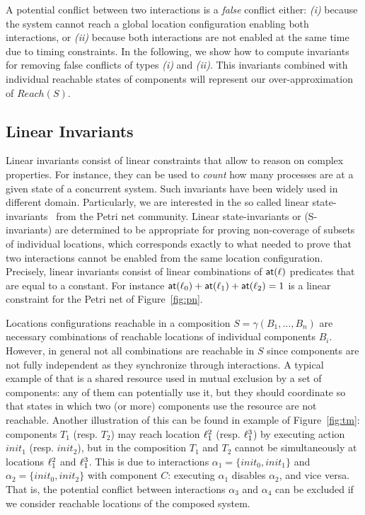 A potential conflict between two interactions is a \emph{false} conflict either: \emph{(i)} 
because the system cannot reach a global location configuration enabling both interactions, 
or \emph{(ii)} because both interactions are not enabled at the same time due to timing 
constraints.
In the following, we show how to compute invariants for removing false conflicts of
types \emph{(i)} and \emph{(ii)}. This invariants combined with
individual reachable states of components will represent our over-approximation of $Reach(S)$.
\subsection{Linear Invariants}

Linear invariants consist of linear constraints that allow to reason on complex properties.
For instance, they can be used to \emph{count} how many processes are at a given state
of a concurrent system. Such invariants have been widely used in different domain.
Particularly, we are interested in the so called linear state-invariants~\cite{petri,inv1,inv2} 
from the 
Petri net community. Linear state-invariants or (S-invariants) are determined to be 
appropriate for proving non-coverage of subsets of individual locations, 
which corresponds exactly to what needed to prove that two interactions 
cannot be enabled from the same location configuration.
Precisely, linear invariants consist of linear combinations of $\textsf{at}(\ell)$ predicates that are
equal to a constant. For instance $\textsf{at}(\ell_0)+\textsf{at}(\ell_1)+\textsf{at}(\ell_2)=1$ is a linear constraint
for the Petri net of Figure~\ref{fig:pn}.

Locations configurations reachable in a composition 
$S = \gamma(B_1,\dotsc,B_n)$ are necessary combinations 
of reachable locations of individual components $B_i$.
However, in general not all combinations are reachable in $S$ since components are not 
fully independent as they synchronize through interactions.
A typical example of that is a shared resource used in mutual exclusion by a set of 
components: any of them can potentially use it, but they should coordinate so that states in 
which two (or more) components use the resource are not reachable.
Another illustration of this can be found in example of Figure~\ref{fig:tm}: components 
$T_1$ (resp. $T_2$) may reach location $\ell_1^2$ (resp. $\ell_1^3$) by executing 
action $init_1$ (resp. $init_2$), but in the composition $T_1$ and $T_2$ cannot be 
simultaneously at locations $\ell_1^2$ and $\ell_1^3$.
This is due to interactions $\alpha_1 = \{ init_0, init_1 \}$ and 
$\alpha_2 = \{ init_0, init_2 \}$ with component $C$: executing $\alpha_1$ disables 
$\alpha_2$, and vice versa.
That is, the potential conflict between interactions $\alpha_3$ and $\alpha_4$ can be 
excluded if we consider reachable locations of the composed system.


